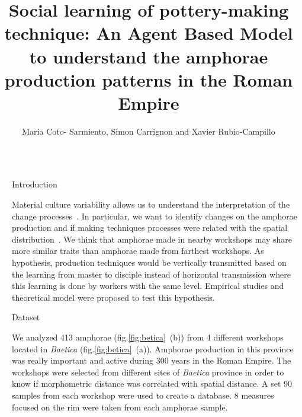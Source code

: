 \documentclass[final]{beamer}
\title{Social learning of pottery-making technique: An Agent Based Model to understand the amphorae production patterns in the Roman Empire}
\author{Maria Coto- Sarmiento, Simon Carrignon and Xavier Rubio-Campillo} %
\institute{Barcelona Supercomputing Center - University of Barcelona} %
\newlength{\sepwid}
\newlength{\onecolwid}
\begin{document}

\setlength{\belowcaptionskip}{2ex} %
\setlength\belowdisplayshortskip{2ex} %

\begin{frame}[t] %

\begin{columns}[t] %

\begin{column}{\sepwid}\end{column} %

\begin{column}{\onecolwid} %


\begin{block}{Introduction}

\justify

Material culture variability allows us to understand the interpretation of the change processes~\cite{lycett}. In particular, we want to identify changes on the amphorae production and if making techniques processes were related with the spatial distribution~\cite{bjo}. We think that amphorae made in nearby workshops may share more similar traits than amphorae made from farthest workshops. As hypothesis, production techniques would be vertically transmitted based on the learning from master to disciple instead of horizontal transmission where this learning is done by workers with the same level. Empirical studies and theoretical model were proposed to test this hypothesis.
 
  
\end{block}


\begin{block}{Dataset}

\justify
We analyzed 413 amphorae (fig.\ref{fig:betica}~(b)) from 4 different workshops located in \emph{Baetica} (fig.\ref{fig:betica}~(a)). Amphorae production in this province was really important and active during 300 years in the Roman Empire. The workshops were selected from different sites of \emph{Baetica} province in order to know if morphometric distance was correlated with spatial distance. A set 90 samples from each workshop were used to create a database. 8 measures focused on the rim were taken from each amphorae sample. 


\end{block}
\end{column}
\end{columns}
\end{frame}
\end{document}
